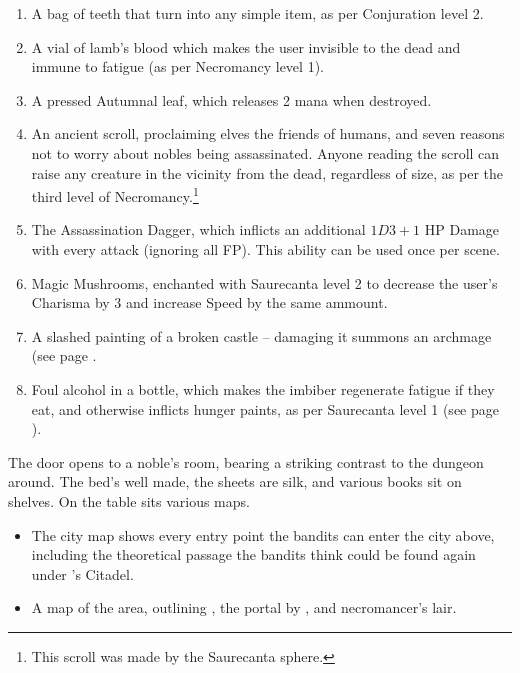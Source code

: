 \begin{multicols}{2}
\begin{enumerate}

	\item{A bag of teeth that turn into any simple item, as per Conjuration level 2.}
	\item{A vial of lamb's blood which makes the user invisible to the dead and immune to fatigue (as per Necromancy level 1).}
	\item{A pressed Autumnal leaf, which releases 2 mana when destroyed.}
	\item{An ancient scroll, proclaiming elves the friends of humans, and seven reasons not to worry about nobles being assassinated.  Anyone reading the scroll can raise any creature in the vicinity from the dead, regardless of size, as per the third level of Necromancy.\footnote{This scroll was made by the Saurecanta sphere.}}
	\item{The Assassination Dagger, which inflicts an additional $1D3+1$ HP Damage with every attack (ignoring all FP).  This ability can be used once per scene.}
	\item{Magic Mushrooms, enchanted with Saurecanta level 2 to decrease the user's Charisma by 3 and increase Speed by the same ammount.}
	\item{A slashed painting of a broken castle -- damaging it summons an archmage (see page \pageref{archmage}.}
	\item{Foul alcohol in a bottle, which makes the imbiber regenerate fatigue if they eat, and otherwise inflicts hunger paints, as per Saurecanta level 1 (see page \pageref{saurecantaone}).}
\end{enumerate}


\begin{boxtext}
	The door opens to a noble's room, bearing a striking contrast to the dungeon around.  The bed's well made, the sheets are silk, and various books sit on shelves.  On the table sits various maps.
\end{boxtext}

\begin{itemize}

	\item{The city map shows every entry point the bandits can enter the city above, including the theoretical passage the bandits think could be found again under 's Citadel.}

	\item{A map of the area, outlining , the portal by , and \gls{necromancer}'s lair.}


\end{itemize}
\end{multicols}
